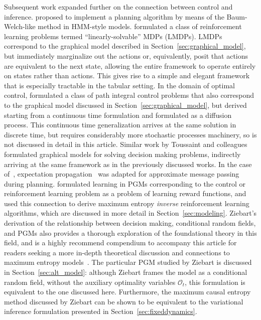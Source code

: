 Subsequent work expanded further on the connection between control and inference. \citet{attias} proposed to implement a planning algorithm by means of the Baum-Welch-like method in HMM-style models. \citet{todorov_lmdp} formulated a class of reinforcement learning problems termed ``linearly-solvable'' MDPs (LMDPs). LMDPs correspond to the graphical model described in Section~\ref{sec:graphical_model}, but immediately marginalize out the actions or, equivalently, posit that actions are equivalent to the next state, allowing the entire framework to operate entirely on states rather than actions. This gives rise to a simple and elegant framework that is especially tractable in the tabular setting. In the domain of optimal control, \citet{kappen_oc} formulated a class of path integral control problems that also correspond to the graphical model discussed in Section~\ref{sec:graphical_model}, but derived starting from a continuous time formulation and formulated as a diffusion process. This continuous time generalization arrives at the same solution in discrete time, but requires considerably more stochastic processes machinery, so is not discussed in detail in this article. Similar work by Toussaint and colleagues~\citep{toussaint_soc,rawlik_soc} formulated graphical models for solving decision making problems, indirectly arriving at the same framework as in the previously discussed works. In the case of~\citet{toussaint_soc}, expectation propagation~\citep{ep} was adapted for approximate message passing during planning. \citet{ziebart_thesis} formulated learning in PGMs corresponding to the control or reinforcement learning problem as a problem of learning reward functions, and used this connection to derive maximum entropy \emph{inverse} reinforcement learning algorithms, which are discussed in more detail in Section~\ref{sec:modeling}. Ziebart's derivation of the relationship between decision making, conditional random fields, and PGMs also provides a thorough exploration of the foundational theory in this field, and is a highly recommend compendium to accompany this article for readers seeking a more in-depth theoretical discussion and connections to maximum entropy models~\citep{ziebart_thesis}. The particular PGM studied by Ziebart is discussed in Section~\ref{sec:alt_model}: although Ziebart frames the model as a conditional random field, without the auxiliary optimality variables $\mathcal{O}_t$, this formulation is equivalent to the one discussed here. Furthermore, the maximum causal entropy method discussed by Ziebart can be shown to be equivalent to the variational inference formulation presented in Section~\ref{sec:fixeddynamics}.


